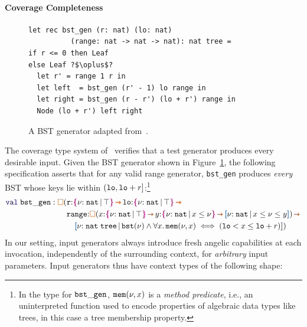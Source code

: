 \paragraph{Coverage Completeness}%
\label{subsec:coverage}
\begin{figure}
  \vspace*{-.2in}
\begin{verbatim}
let rec bst_gen (r: nat) (lo: nat)
          (range: nat -> nat -> nat): nat tree =
if r <= 0 then Leaf
else Leaf ?$\oplus$?
  let r' = range 1 r in
  let left  = bst_gen (r' - 1) lo range in
  let right = bst_gen (r - r') (lo + r') range in
  Node (lo + r') left right
\end{verbatim}
\vspace*{-.1in}
\caption{A BST generator adapted from~\cite{CoverageType}.}
  \label{fig:bst}
\vspace*{-.1in}
\end{figure}
The coverage type system of~\citet{CoverageType} verifies that a test
generator produces every desirable input.  Given the BST generator
shown in Figure~\ref{fig:bst}, the following specification asserts
that for any valid range generator, \texttt{bst\_gen} produces
\emph{every} BST whose keys lie within
$({\tt lo}, {\tt lo}+r]$:\footnote{In the type for
  ${\tt bst\_gen}$, ${\tt mem}(\nu,x)$ is a \emph{method
    predicate}, i.e., an uninterpreted function used to encode
  properties of algebraic data types like trees, in this case a tree
  membership property.}
\vspace{-0.2em}
\begin{align*}
  \mykw{val}\;\Code{bst\_gen} : \ctpers(&
    \Code{r}{:}\ort{\Nat}{\top} \ctsarr \Code{lo}{:}\ort{\Nat}{\top} \ctsarr
  \\&
    \Code{range}{:}\ctpers (x{:}\ort{\Nat}{\top} \ctsarr
      y{:}\ort{\Nat}{x \leq \vnu} \ctsarr
      \urt{\Nat}{x \leq \vnu \leq y})
    \ctsarr
  \\ & \quad
    \urt{\Nat\;\Code{tree}}{\Code{bst}(\vnu) \land
      \forall x.\, \Code{mem}(\vnu, x) \iff
      (\Code{lo} < x \leq \Code{lo}+r)})
\end{align*}
In our setting, input generators always introduce fresh angelic
capabilities at each invocation, independently of the surrounding
context, for \emph{arbitrary} input parameters. Input generators thus
have context types of the following shape:
\vspace{-0.2em}
